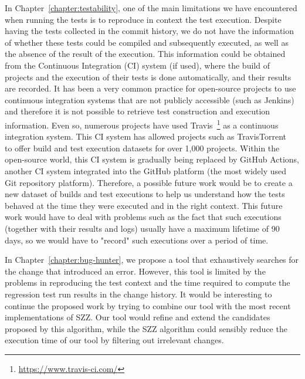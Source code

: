 In Chapter~\ref{chapter:testability}, one of the main limitations we have encountered when running the tests is to reproduce in context the test execution. Despite having the tests collected in the commit history, we do not have the information of whether these tests could be compiled and subsequently executed, as well as the absence of the result of the execution. 
This information could be obtained from the Continuous Integration (CI) system (if used), where the build of projects and the execution of their tests is done automatically, and their results are recorded.
It has been a very common practice for open-source projects to use continuous integration systems that are not publicly accessible (such as Jenkins) and therefore it is not possible to retrieve test construction and execution information. 
Even so, numerous projects have used Travis~\footnote{\url{https://www.travis-ci.com/}} as a continuous integration system. This CI system has allowed projects such as TravisTorrent~\cite{msr17challenge} to offer build and test execution datasets for over 1,000 projects. 
Within the open-source world, this CI system is gradually being replaced by GitHub Actions, another CI system integrated into the GitHub platform (the most widely used Git repository platform). 
Therefore, a possible future work would be to create a new dataset of builds and test executions to help us understand how the tests behaved at the time they were executed and in the right context. 
This future work would have to deal with problems such as the fact that such executions (together with their results and logs) usually have a maximum lifetime of 90 days, so we would have to "record" such executions over a period of time.

In Chapter~\ref{chapter:bug-hunter}, we propose a tool that exhaustively searches for the change that introduced an error. 
However, this tool is limited by the problems in reproducing the test context and the time required to compute the regression test run results in the change history.
It would be interesting to continue the proposed work by trying to combine our tool with the most recent implementations of SZZ. 
Our tool would refine and extend the candidates proposed by this algorithm, while the SZZ algorithm could sensibly reduce the execution time of our tool by filtering out irrelevant changes.

